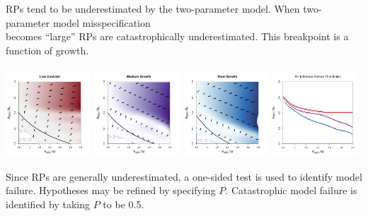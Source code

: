 \documentclass[a0paper,portrait]{baposter}
\begin{document}
\begin{poster}
{	%
        \begin{minipage}[h!]{0.74\textwidth}
	\raggedright
	RPs tend to be underestimated by the two-parameter model. When two-parameter model misspecification\\ 
	becomes ``large'' %
	RPs are catastrophically underestimated. This breakpoint is a function of growth.\\$~$\\
	\includegraphics[width=0.24\textwidth]{../../ddBias/directionalBiasDDSubFlatT45N150A0-1AS0.1K10N56Reds 2.png}
	\includegraphics[width=0.24\textwidth]{../../ddBias/directionalBiasDDSubFlatT45N150A0-1AS1K0.5N56Purples.png}
	\includegraphics[width=0.24\textwidth]{../../ddBias/directionalBiasDDSubFlatT45N150A0-1AS2K0.1N84EdgeBlues.png}
	\includegraphics[width=0.24\textwidth]{../../ddBias/relErrorImagesBHDD0.5.png}	
	
	\vspace{0.2cm}
	Since RPs are generally underestimated, a one-sided test is used to identify model failure. %
	Hypotheses may be refined by specifying $P$.
	Catastrophic model failure is identified by taking $P$ to be 0.5. 


\end{minipage}}
\end{poster}
\end{document}
